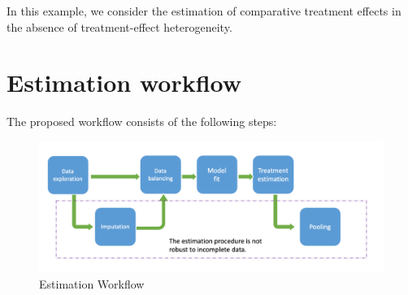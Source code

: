 \documentclass[
  letterpaper,
  DIV=11,
  numbers=noendperiod]{scrreprt}
\begin{document}
In this example, we consider the estimation of comparative treatment
effects in the absence of treatment-effect heterogeneity.

\hypertarget{estimation-workflow}{%
\section{Estimation workflow}\label{estimation-workflow}}

The proposed workflow consists of the following steps:

\begin{figure}

{\centering \includegraphics{resources/chapter 09/Workflow.png}

}

\caption{Estimation Workflow}

\end{figure}
\end{document}
